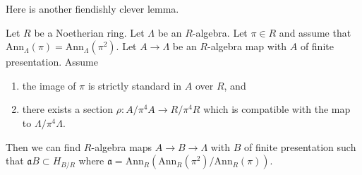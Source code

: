 \noindent
Here is another fiendishly clever lemma.

\begin{lemma}
\label{lemma-desingularize}
Let $R$ be a Noetherian ring.
Let $\Lambda$ be an $R$-algebra. Let $\pi \in R$ and
assume that $\text{Ann}_\Lambda(\pi) = \text{Ann}_\Lambda(\pi^2)$. Let
$A \to \Lambda$ be an $R$-algebra map with $A$ of finite
presentation. Assume
\begin{enumerate}
\item the image of $\pi$ is strictly standard in $A$ over $R$, and
\item there exists a section $\rho : A/\pi^4 A \to R/\pi^4 R$
which is compatible with the map to $\Lambda/\pi^4 \Lambda$.
\end{enumerate}
Then we can find $R$-algebra maps $A \to B \to \Lambda$ with $B$
of finite presentation such that $\mathfrak a B \subset H_{B/R}$ where
$\mathfrak a = \text{Ann}_R(\text{Ann}_R(\pi^2)/\text{Ann}_R(\pi))$.
\end{lemma}

